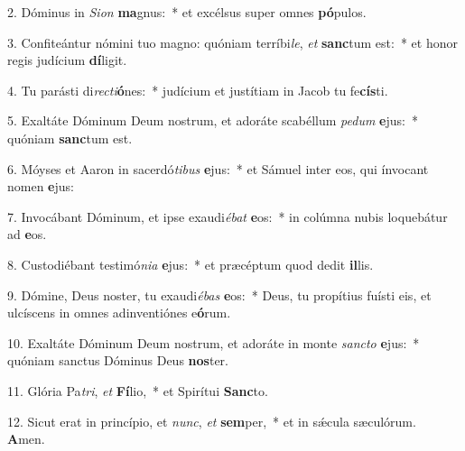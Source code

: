 2. Dóminus in \textit{Si}\textit{on} \textbf{ma}gnus:~*  et excélsus super omnes \textbf{pó}pulos.\

3. Confiteántur nómini tuo magno: quóniam terríbi\textit{le}, \textit{et} \textbf{sanc}tum est:~*  et honor regis judícium \textbf{dí}ligit.\

4. Tu parásti di\textit{rec}\textit{ti}\textbf{ó}nes:~*  judícium et justítiam in Jacob tu fe\textbf{cís}ti.\

5. Exaltáte Dóminum Deum nostrum, et adoráte scabéllum \textit{pe}\textit{dum} \textbf{e}jus:~*  quóniam \textbf{sanc}tum est.\

6. Móyses et Aaron in sacerdó\textit{ti}\textit{bus} \textbf{e}jus:~*  et Sámuel inter eos, qui ínvocant nomen \textbf{e}jus:\

7. Invocábant Dóminum, et ipse exaudi\textit{é}\textit{bat} \textbf{e}os:~*  in colúmna nubis loquebátur ad \textbf{e}os.\

8. Custodiébant testimó\textit{ni}\textit{a} \textbf{e}jus:~*  et præcéptum quod dedit \textbf{il}lis.\

9. Dómine, Deus noster, tu exaudi\textit{é}\textit{bas} \textbf{e}os:~*  Deus, tu propítius fuísti eis, et ulcíscens in omnes adinventiónes e\textbf{ó}rum.\

10. Exaltáte Dóminum Deum nostrum, et adoráte in monte \textit{sanc}\textit{to} \textbf{e}jus:~*  quóniam sanctus Dóminus Deus \textbf{nos}ter.\

11. Glória Pa\textit{tri}, \textit{et} \textbf{Fí}lio,~*  et Spirítui \textbf{Sanc}to.\

12. Sicut erat in princípio, et \textit{nunc}, \textit{et} \textbf{sem}per,~*  et in sǽcula sæculórum. \textbf{A}men.\

